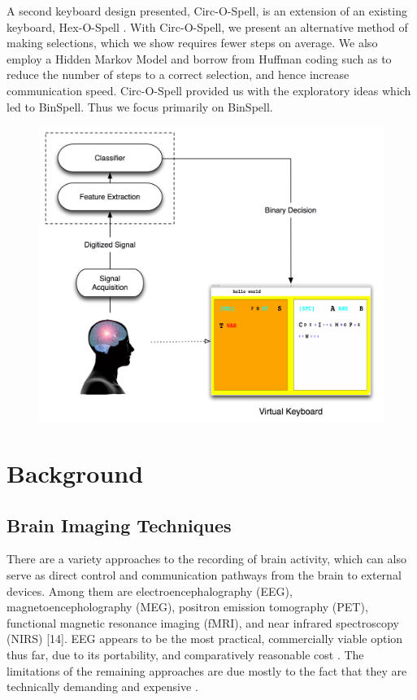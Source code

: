 \documentclass[12pt,titlepage]{article}
\begin{document}
A second keyboard design presented, Circ-O-Spell, is an extension of an existing keyboard, 
Hex-O-Spell \cite{blankertz_advanced}.  With Circ-O-Spell, we present an alternative method of making selections, which we show requires fewer steps on average.  We also employ a Hidden Markov Model and 
borrow from Huffman coding such as to reduce the number of steps to a correct selection, and 
hence increase communication speed.  Circ-O-Spell provided us with the exploratory ideas 
which led to BinSpell.  Thus we focus primarily on BinSpell.

\begin{figure}[t]
\begin{center}
	\includegraphics[scale=0.40]{Figure1.jpg}
	\label{fig:BCI}
\end{center}
\end{figure}

\section{Background}

\subsection{Brain Imaging Techniques}

There are a variety approaches to the recording of brain activity, which can also serve as direct control 
and communication pathways from the brain to external devices.  Among them are 
electroencephalography (EEG), magnetoencepholography (MEG), positron emission tomography 
(PET), functional magnetic resonance imaging (fMRI), and near infrared spectroscopy (NIRS) [14].  EEG 
appears to be the most practical, commercially viable option thus far, due to its portability, and 
comparatively reasonable cost \cite{_next_????}.  The limitations of the remaining approaches are due mostly to the fact that they are technically demanding and expensive \cite{wolpaw_braincomputer_2002}.
\end{document}
